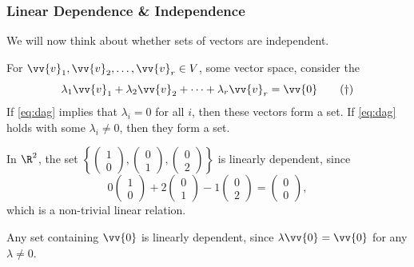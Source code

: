 \subsubsection{Linear Dependence \& Independence}

We will now think about whether sets of vectors are independent. 

\begin{definition}
    For $\vv{v}_1, \vv{v}_2, \dots, \vv{v}_r \in V$, some vector space, consider the 
    \begin{equation}\label{eq:dag}
        \lambda_1 \vv{v}_1 + \lambda_2 \vv{v}_2 + \cdots + \lambda_r \vv{v}_r = \vv{0} \tag{$\dagger$}
    \end{equation}
    If \eqref{eq:dag} implies that $\lambda_i = 0$ for all $i$, then these vectors form a  set. If \eqref{eq:dag} holds with some $\lambda_i \neq 0$, then they form a  set.
\end{definition}


\begin{example}
    In $\R^2$, the set $\left\{\begin{pmatrix}1 \\ 0\end{pmatrix}, \begin{pmatrix}0 \\ 1\end{pmatrix}, \begin{pmatrix}0 \\ 2\end{pmatrix}\right\}$ is linearly dependent, since
    $$
    0\begin{pmatrix}1 \\ 0\end{pmatrix} + 2\begin{pmatrix}0 \\ 1\end{pmatrix} - 1\begin{pmatrix}0 \\ 2\end{pmatrix} = \begin{pmatrix}0 \\ 0\end{pmatrix},
    $$
    which is a non-trivial linear relation.
\end{example}

Any set containing $\vv{0}$ is linearly dependent, since $\lambda \vv{0} = \vv{0}$ for any $\lambda \neq 0$.

